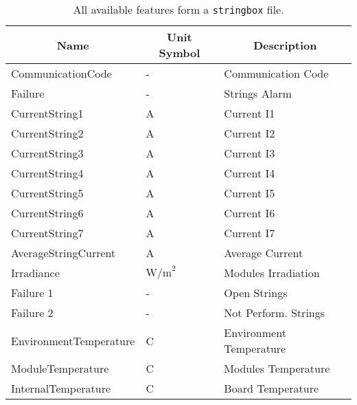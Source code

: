 \begin{table}[H]
	\begin{center}
		\begin{tabular}[c]{l|l|l}
			\hline
			\multicolumn{1}{c|}{\textbf{Name}}        &
			\multicolumn{1}{c|}{\textbf{Unit Symbol}} &
			\multicolumn{1}{c}{\textbf{Description}}                                           \\
			\hline
			CommunicationCode                         & -              & Communication Code \\
			Failure                                   & -              & Strings Alarm      \\
			CurrentString1                            & A              & Current I1           \\
			CurrentString2                            & A              & Current I2           \\
			CurrentString3                            & A              & Current I3           \\
			CurrentString4                            & A              & Current  I4           \\
			CurrentString5                            & A              & Current I5           \\
			CurrentString6                            & A              & Current I6           \\
			CurrentString7                            & A              & Current I7           \\
			AverageStringCurrent                      & A              & Average Current        \\
			Irradiance                                & $\text{W/m}^2$ & Modules Irradiation  \\
			Failure 1                                 & -              & Open Strings       \\
			Failure 2                                 & -              & Not Perform. Strings \\
			EnvironmentTemperature                    & C              & Environment Temperature  \\
			ModuleTemperature                         & C              & Modules Temperature    \\
			InternalTemperature                       & C              & Board Temperature    \\
			\hline
		\end{tabular}
		\caption{All available features form a \texttt{stringbox} file.}\label{tab:junctionfeatures}
	\end{center}
\end{table}


